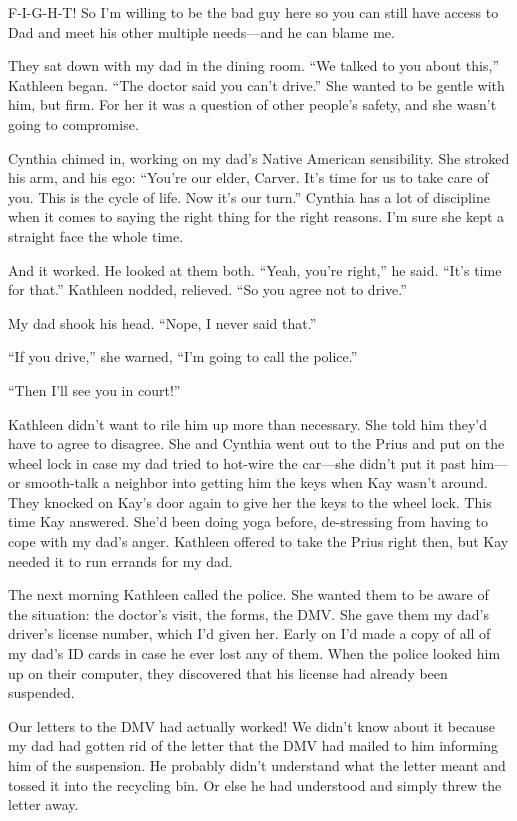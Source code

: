 \documentclass[12pt]{book}
\begin{document}
F-I-G-H-T! So I'm willing to be the bad guy here so you can still have access to Dad and meet his other multiple needs---and he can blame me.

They sat down with my dad in the dining room. ``We talked to you about this,'' Kathleen began. ``The doctor said you can't drive.'' She wanted to be gentle with him, but firm. For her it was a question of other people's safety, and she wasn't going to compromise.

Cynthia chimed in, working on my dad's Native American sensibility. She stroked his arm, and his ego: ``You're our elder, Carver. It's time for us to take care of you. This is the cycle of life. Now it's our turn.'' Cynthia has a lot of discipline when it comes to saying the right thing for the right reasons. I'm sure she kept a straight face the whole time.

And it worked. He looked at them both. ``Yeah, you're right,'' he said. ``It's time for that.'' Kathleen nodded, relieved. ``So you agree not to drive.''

My dad shook his head. ``Nope, I never said that.''

``If you drive,'' she warned, ``I'm going to call the police.''

``Then I'll see you in court!''

Kathleen didn't want to rile him up more than necessary. She told him they'd have to agree to disagree. She and Cynthia went out to the Prius and put on the wheel lock in case my dad tried to hot-wire the car---she didn't put it past him---or smooth-talk a neighbor into getting him the keys when Kay wasn't around. They knocked on Kay's door again to give her the keys to the wheel lock. This time Kay answered. She'd been doing yoga before, de-stressing from having to cope with my dad's anger. Kathleen offered to take the Prius right then, but Kay needed it to run errands for my dad.

The next morning Kathleen called the police. She wanted them to be aware of the situation: the doctor's visit, the forms, the DMV. She gave them my dad's driver's license number, which I'd given her. Early on I'd made a copy of all of my dad's ID cards in case he ever lost any of them. When the police looked him up on their computer, they discovered that his license had already been suspended.

Our letters to the DMV had actually worked! We didn't know about it because my dad had gotten rid of the letter that the DMV had mailed to him informing him of the suspension. He probably didn't understand what the letter meant and tossed it into the recycling bin. Or else he had understood and simply threw the letter away.
\end{document}
